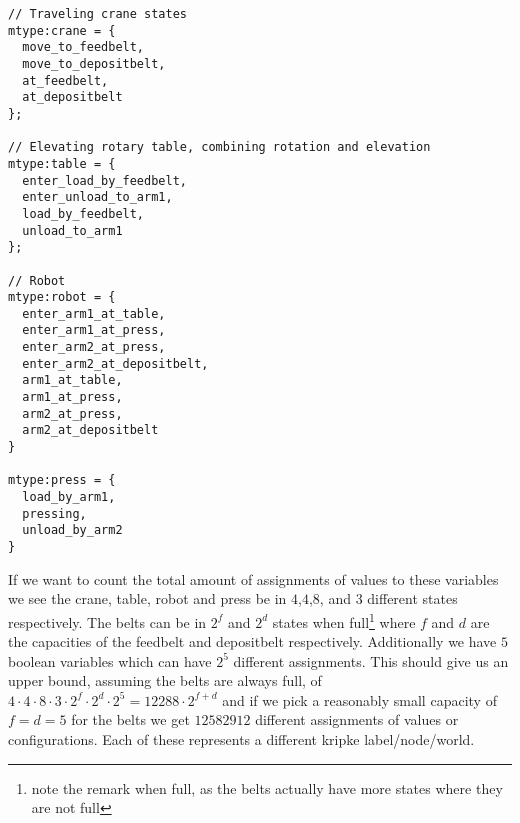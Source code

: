 \documentclass[12pt]{article}
\begin{document}
\begin{lstlisting}[caption={actor states},label={lst:actorstates}]
// Traveling crane states
mtype:crane = {
  move_to_feedbelt,
  move_to_depositbelt,
  at_feedbelt,
  at_depositbelt
};

// Elevating rotary table, combining rotation and elevation
mtype:table = {
  enter_load_by_feedbelt,
  enter_unload_to_arm1,
  load_by_feedbelt,
  unload_to_arm1
};

// Robot
mtype:robot = {
  enter_arm1_at_table,
  enter_arm1_at_press,
  enter_arm2_at_press,
  enter_arm2_at_depositbelt,
  arm1_at_table,
  arm1_at_press,
  arm2_at_press,
  arm2_at_depositbelt  
}

mtype:press = {
  load_by_arm1,
  pressing,
  unload_by_arm2
}
\end{lstlisting}
If we want to count the total amount of assignments of values to these variables we see
the crane, table, robot and press be in $4$,$4$,$8$, and $3$ different states respectively.
The belts can be in $2^f$ and $2^d$ states when full\footnote{note the remark when full, as
the belts actually have more states where they are not full} where $f$ and $d$ are the capacities of the feedbelt
and depositbelt respectively. Additionally we have $5$ boolean variables which can have $2^5$ different assignments.
This should give us an upper bound, assuming the belts
are always full, of $4 \cdot 4 \cdot 8 \cdot 3 \cdot 2^f \cdot 2^d \cdot 2^5 = 12288 \cdot 2^{f+d}$ and if
we pick a reasonably small capacity of $f=d=5$ for the belts we get $12582912$ different assignments of values
or configurations. Each of these represents a different kripke label/node/world.
\end{document}
